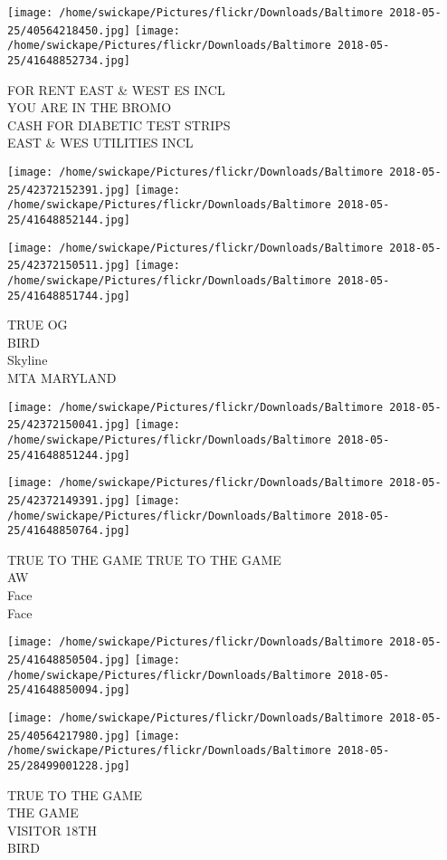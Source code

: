 \documentclass[10pt,letterpaper]{article}
\begin{document}
\texttt{[image: /home/swickape/Pictures/flickr/Downloads/Baltimore 2018-05-25/40564218450.jpg]}
\texttt{[image: /home/swickape/Pictures/flickr/Downloads/Baltimore 2018-05-25/41648852734.jpg]}

FOR RENT EAST \& WEST ES INCL\\
YOU ARE IN THE BROMO\\
CASH FOR DIABETIC TEST STRIPS\\
EAST \& WES UTILITIES INCL
\pagebreak

\texttt{[image: /home/swickape/Pictures/flickr/Downloads/Baltimore 2018-05-25/42372152391.jpg]}
\texttt{[image: /home/swickape/Pictures/flickr/Downloads/Baltimore 2018-05-25/41648852144.jpg]}

\texttt{[image: /home/swickape/Pictures/flickr/Downloads/Baltimore 2018-05-25/42372150511.jpg]}
\texttt{[image: /home/swickape/Pictures/flickr/Downloads/Baltimore 2018-05-25/41648851744.jpg]}

TRUE OG\\
BIRD\\
Skyline\\
MTA MARYLAND
\pagebreak

\texttt{[image: /home/swickape/Pictures/flickr/Downloads/Baltimore 2018-05-25/42372150041.jpg]}
\texttt{[image: /home/swickape/Pictures/flickr/Downloads/Baltimore 2018-05-25/41648851244.jpg]}

\texttt{[image: /home/swickape/Pictures/flickr/Downloads/Baltimore 2018-05-25/42372149391.jpg]}
\texttt{[image: /home/swickape/Pictures/flickr/Downloads/Baltimore 2018-05-25/41648850764.jpg]}

TRUE TO THE GAME TRUE TO THE GAME\\
AW\\
Face\\
Face
\pagebreak

\texttt{[image: /home/swickape/Pictures/flickr/Downloads/Baltimore 2018-05-25/41648850504.jpg]}
\texttt{[image: /home/swickape/Pictures/flickr/Downloads/Baltimore 2018-05-25/41648850094.jpg]}

\texttt{[image: /home/swickape/Pictures/flickr/Downloads/Baltimore 2018-05-25/40564217980.jpg]}
\texttt{[image: /home/swickape/Pictures/flickr/Downloads/Baltimore 2018-05-25/28499001228.jpg]}

TRUE TO THE GAME\\
THE GAME\\
VISITOR 18TH\\
BIRD
\pagebreak
\end{document}
